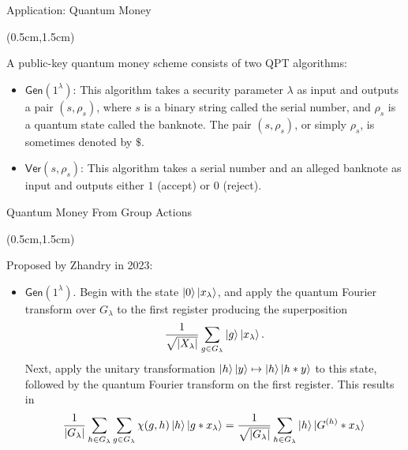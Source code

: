 \documentclass{beamer}
\theoremstyle{definition}
\newcommand{\gen}{\mathsf{Gen}}
\newcommand{\ver}{\mathsf{Ver}}
\begin{document}
\begin{frame}{Application: Quantum Money}
    
    \begin{textblock*}{12cm}(0.5cm,1.5cm)
            
        A public-key quantum money scheme consists of two QPT algorithms:
        \vspace{1cm} 
        \begin{itemize}
        \item $\gen(1^\lambda)$: This algorithm takes a security parameter $\lambda$ as input and outputs a pair $(s, \rho_s)$, where $s$ is a binary string called the serial number, and $\rho_s$ is a quantum state called the banknote. The pair $(s, \rho_s)$, or simply $\rho_s$, is sometimes denoted by $\$$.
        
        \vspace{1cm}
        \item $\ver(s, \rho_s)$: This algorithm takes a serial number and an alleged banknote as input and outputs either $1$ (accept) or $0$ (reject).
        \end{itemize}

    \end{textblock*}


\end{frame}





\begin{frame}{Quantum Money From Group Actions}
    
    \begin{textblock*}{12cm}(0.5cm,1.5cm)
        
        Proposed by Zhandry in 2023:
        
        \begin{itemize}
        \item $\gen(1^\lambda)$. Begin with the state $\ket{0}\ket{x_\lambda}$, and apply the quantum Fourier transform over $G_\lambda$ to the first register producing the superposition
        \[ \frac{1}{\sqrt{{|X_\lambda|}}} \sum_{g \in G_\lambda} \ket{g}\ket{x_\lambda}. \]
        Next, apply the unitary transformation $\ket{h}\ket{y} \mapsto \ket{h}\ket{h * y}$ to this state, followed by the quantum Fourier transform on the first register. This results in
        \[ \frac{1}{{|G_\lambda|}} \sum_{h \in G_\lambda} \sum_{g \in G_\lambda} \chi(g, h) \ket{h}\ket{g * x_\lambda} = \frac{1}{\sqrt{{|G_\lambda|}}} \sum_{h \in G_\lambda} \ket{h} \ket{G^{(h)} * x_\lambda} \]

        \end{itemize}

        
    \end{textblock*}


\end{frame}
\end{document}
